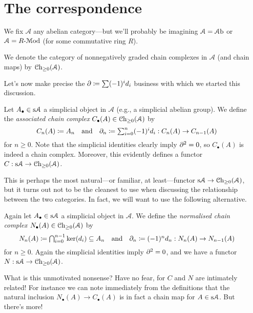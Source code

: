 
\renewcommand{\A}{\mathcal{A}}

\section{The correspondence}

We fix $\A$ any abelian category---but we'll probably be imagining $\A
= \Ab$ or $\A = R\text{-}\Mod$ (for some commutative ring $R$).

\begin{notation}
  We denote the category of nonnegatively graded chain complexes in
  $\A$ (and chain maps) by $\Ch_{\ge 0}(\A)$.
\end{notation}

Let's now make precise the $\partial \coloneqq \sum (-1)^i d_i$ business
with which we started this discussion.

\begin{definition}
  Let $A_\bullet \in \s\A$ a simplicial object in $\A$ (e.g., a
  simplicial abelian group). We define the \textit{associated chain
    complex} $C_\bullet(A) \in \Ch_{\ge 0}(\A)$ by
  \[
  \textstyle{C_n(A) \coloneqq A_n \quad\text{and}\quad \partial_n
    \coloneqq \sum_{i=0}^n (-1)^i d_i : C_n(A) \to C_{n-1}(A)}
  \]
  for $n \ge 0$. Note that the simplicial identities clearly imply
  $\partial^2 = 0$, so $C_\bullet(A)$ is indeed a chain complex. Moreover,
  this evidently defines a functor $C : \s\A \to \Ch_{\ge 0}(\A)$.
\end{definition}

This is perhaps the most natural---or familiar, at least---functor
$\s\A \to \Ch_{\ge 0}(\A)$, but it turns out not to be the cleanest to
use when discussing the relationship between the two categories. In
fact, we will want to use the following alternative.

\begin{definition}
  Again let $A_\bullet \in \s\A$ a simplicial object in $\A$. We
  define the \textit{normalised chain complex} $N_\bullet(A) \in
  \Ch_{\ge 0}(\A)$ by
  \[
  \textstyle{N_n(A) \coloneqq \bigcap_{i=0}^{n-1} \ker(d_i) \subseteq
    A_n \quad\text{and}\quad \partial_n \coloneqq (-1)^n d_n : N_n(A) \to
    N_{n-1}(A)}
  \]
  for $n \ge 0$. Again the simplicial identities imply $\partial^2 = 0$,
  and we have a functor $N : \s\A \to \Ch_{\ge 0}(\A)$.
\end{definition}

What is this unmotivated nonsense? Have no fear, for $C$ and $N$ are
intimately related! For instance we can note immediately from the
definitions that the natural inclusion $N_\bullet(A) \to C_\bullet(A)$
is in fact a chain map for $A \in \s\A$. But there's more!

